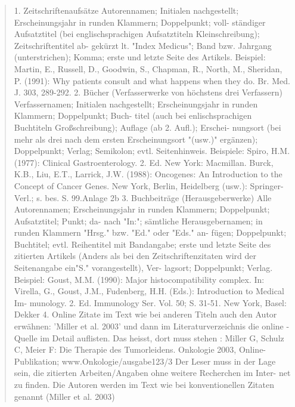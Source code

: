 \documentclass{article}
\begin{document}
\begin{quote}
	1. Zeitschriftenaufsätze
Autorennamen; Initialen nachgestellt; Erscheinungsjahr in runden Klammern; Doppelpunkt; voll-
ständiger Aufsatztitel (bei englischsprachigen Aufsatztiteln Kleinschreibung); Zeitschriftentitel ab-
gekürzt lt. "Index Medicus"; Band bzw. Jahrgang (unterstrichen); Komma; erste und letzte Seite des
Artikels.
Beispiel: Martin, E., Russell, D., Goodwin, S., Chapman, R.,
North, M., Sheridan, P. (1991):
Why patients consult and what happens when they do.
Br. Med. J. 303, 289-292.
2. Bücher (Verfasserwerke von höchstens drei Verfassern)
Verfassernamen; Initialen nachgestellt; Erscheinungsjahr in runden Klammern; Doppelpunkt; Buch-
titel (auch bei enlischsprachigen Buchtiteln Großschreibung); Auflage (ab 2. Aufl.); Erschei-
nungsort (bei mehr als drei nach dem ersten Erscheinungsort "(usw.)" ergänzen); Doppelpunkt;
Verlag; Semikolon; evtl. Seitenhinweis.
Beispiele: Spiro, H.M. (1977):
Clinical Gastroenterology. 2. Ed.
New York: Macmillan.
Burck, K.B., Liu, E.T., Larrick, J.W. (1988):
Oncogenes: An Introduction to the Concept of Cancer
Genes. New York, Berlin, Heidelberg (usw.):
Springer-Verl.; s. bes. S. 99.Anlage 2b
3. Buchbeiträge (Herausgeberwerke)
Alle Autorennamen; Erscheinungsjahr in runden Klammern; Doppelpunkt; Aufsatztitel; Punkt; da-
nach "In:"; sämtliche Herausgebernamen; in runden Klammern "Hrsg." bzw. "Ed." oder "Eds." an-
fügen; Doppelpunkt; Buchtitel; evtl. Reihentitel mit Bandangabe; erste und letzte Seite des zitierten
Artikels (Anders als bei den Zeitschriftenzitaten wird der Seitenangabe ein"S." vorangestellt), Ver-
lagsort; Doppelpunkt; Verlag.
Beispiel: Goust, M.M. (1990): Major histocompatibility complex.
In: Virella, G., Goust, J.M., Fudenberg, H.H. (Eds.): Introduction to Medical Im-
munology.
2. Ed. Immunology Ser. Vol. 50; S. 31-51. New York,
Basel: Dekker
4. Online Zitate
im Text wie bei anderen Titeln auch den Autor erwähnen:
'Miller et al. 2003' und dann im Literaturverzeichnis die online - Quelle
im Detail auflisten. Das heisst, dort muss stehen :
Miller G, Schulz C, Meier F: Die Therapie des Tumorleidens. Onkologie 2003,
Online-Publikation; www.Onkologie/ausgabe123/3
Der Leser muss in der Lage sein, die zitierten Arbeiten/Angaben ohne weitere Recherchen im Inter-
net zu finden. Die Autoren werden im Text wie bei konventionellen Zitaten genannt (Miller et al.
2003)
\end{quote}

\printbibliography
\end{document}
